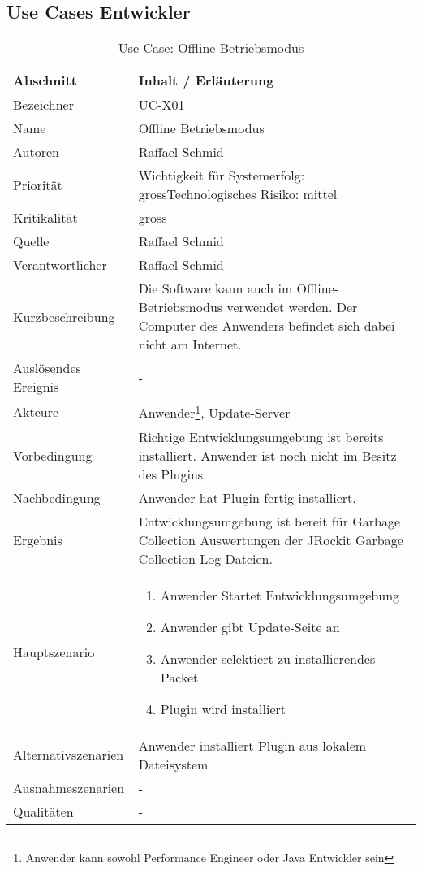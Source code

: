 \subsection{Use Cases Entwickler}
\begin{longtable}{|p{4cm}|p{10.5cm}|}
  \caption{Use-Case: Offline Betriebsmodus}\\\hline
   \textbf{Abschnitt} & \textbf{Inhalt / Erläuterung} \\\hline
   Bezeichner & UC-X01\\\hline
   Name & Offline Betriebsmodus\\\hline
   Autoren & Raffael Schmid\\\hline
   Priorität & Wichtigkeit für Systemerfolg: gross\newline Technologisches Risiko: mittel\\\hline
   Kritikalität & gross\\\hline
   Quelle & Raffael Schmid\\\hline
   Verantwortlicher & Raffael Schmid\\\hline
   Kurzbeschreibung & Die Software kann auch im Offline-Betriebsmodus verwendet werden. Der Computer des Anwenders befindet sich dabei nicht am Internet.\\\hline
   Auslösendes Ereignis & -\\\hline
   Akteure & Anwender\footnote{Anwender kann sowohl Performance Engineer oder Java Entwickler sein}, Update-Server\\\hline
   Vorbedingung & Richtige Entwicklungsumgebung ist bereits installiert. Anwender ist noch nicht im Besitz des Plugins.\\\hline
   Nachbedingung & Anwender hat Plugin fertig installiert.\\\hline
   Ergebnis & Entwicklungsumgebung ist bereit für Garbage Collection Auswertungen der JRockit Garbage Collection Log Dateien.\\\hline
   Hauptszenario & 
         \begin{enumerate}
		\item Anwender Startet Entwicklungsumgebung
		\item Anwender gibt Update-Seite an
		\item Anwender selektiert zu installierendes Packet
		\item Plugin wird installiert	
 	\end{enumerate}
	\\\hline
   Alternativszenarien & Anwender installiert Plugin aus lokalem Dateisystem\\\hline
   Ausnahmeszenarien & -\\\hline
   Qualitäten & -\\\hline
\end{longtable}


